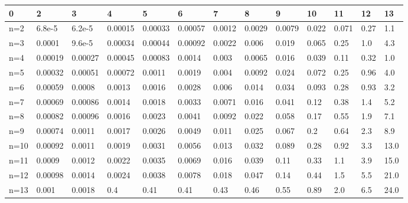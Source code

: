\begin{tabular}{l|llllllllllll}
\toprule 
0 & 2 & 3 & 4 & 5 & 6 & 7 & 8 & 9 & 10 & 11 & 12 & 13 \\
\hline 
n=2 & 6.8e-5 & 6.2e-5 & 0.00015 & 0.00033 & 0.00057 & 0.0012 & 0.0029 & 0.0079 & 0.022 & 0.071 & 0.27 & 1.1 \\
n=3 & 0.0001 & 9.6e-5 & 0.00034 & 0.00044 & 0.00092 & 0.0022 & 0.006 & 0.019 & 0.065 & 0.25 & 1.0 & 4.3 \\
n=4 & 0.00019 & 0.00027 & 0.00045 & 0.00083 & 0.0014 & 0.003 & 0.0065 & 0.016 & 0.039 & 0.11 & 0.32 & 1.0 \\
n=5 & 0.00032 & 0.00051 & 0.00072 & 0.0011 & 0.0019 & 0.004 & 0.0092 & 0.024 & 0.072 & 0.25 & 0.96 & 4.0 \\
n=6 & 0.00059 & 0.0008 & 0.0013 & 0.0016 & 0.0028 & 0.006 & 0.014 & 0.034 & 0.093 & 0.28 & 0.93 & 3.2 \\
n=7 & 0.00069 & 0.00086 & 0.0014 & 0.0018 & 0.0033 & 0.0071 & 0.016 & 0.041 & 0.12 & 0.38 & 1.4 & 5.2 \\
n=8 & 0.00082 & 0.00096 & 0.0016 & 0.0023 & 0.0041 & 0.0092 & 0.022 & 0.058 & 0.17 & 0.55 & 1.9 & 7.1 \\
n=9 & 0.00074 & 0.0011 & 0.0017 & 0.0026 & 0.0049 & 0.011 & 0.025 & 0.067 & 0.2 & 0.64 & 2.3 & 8.9 \\
n=10 & 0.00092 & 0.0011 & 0.0019 & 0.0031 & 0.0056 & 0.013 & 0.032 & 0.089 & 0.28 & 0.92 & 3.3 & 13.0 \\
n=11 & 0.0009 & 0.0012 & 0.0022 & 0.0035 & 0.0069 & 0.016 & 0.039 & 0.11 & 0.33 & 1.1 & 3.9 & 15.0 \\
n=12 & 0.00098 & 0.0014 & 0.0024 & 0.0038 & 0.0078 & 0.018 & 0.047 & 0.14 & 0.44 & 1.5 & 5.5 & 21.0 \\
n=13 & 0.001 & 0.0018 & 0.4 & 0.41 & 0.41 & 0.43 & 0.46 & 0.55 & 0.89 & 2.0 & 6.5 & 24.0 \\
\bottomrule 
\end{tabular}
